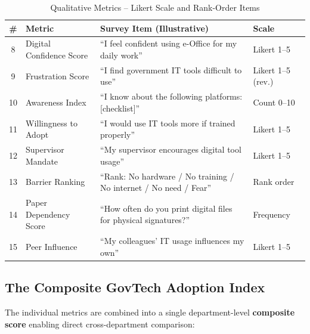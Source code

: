 \documentclass[12pt,a4paper]{article}
\begin{document}
\begin{table}[H]
\centering
\caption{Qualitative Metrics -- Likert Scale and Rank-Order Items}
\label{tab:metrics_qual}
\begin{tabularx}{\textwidth}{@{}clXl@{}}
\toprule
\textbf{\#} & \textbf{Metric} & \textbf{Survey Item (Illustrative)} & \textbf{Scale} \\
\midrule
8 & Digital Confidence Score & ``I feel confident using e-Office for my daily work'' & Likert 1--5 \\
9 & Frustration Score & ``I find government IT tools difficult to use'' & Likert 1--5 (rev.) \\
10 & Awareness Index & ``I know about the following platforms: [checklist]'' & Count 0--10 \\
11 & Willingness to Adopt & ``I would use IT tools more if trained properly'' & Likert 1--5 \\
12 & Supervisor Mandate & ``My supervisor encourages digital tool usage'' & Likert 1--5 \\
13 & Barrier Ranking & ``Rank: No hardware / No training / No internet / No need / Fear'' & Rank order \\
14 & Paper Dependency Score & ``How often do you print digital files for physical signatures?'' & Frequency \\
15 & Peer Influence & ``My colleagues' IT usage influences my own'' & Likert 1--5 \\
\bottomrule
\end{tabularx}
\end{table}

\subsection{The Composite GovTech Adoption Index}

The individual metrics are combined into a single department-level {\bfseries composite score} enabling direct cross-department comparison:
\end{document}
